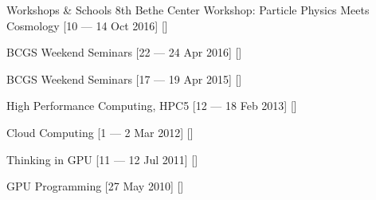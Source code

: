 \begin{cvsection}{Workshops \& Schools}
    \cvitem
    {8th Bethe Center Workshop: Particle Physics Meets Cosmology}
    [10 --- 14 Oct 2016]
    [\badhonnef]
    
    \cvitem
    {BCGS Weekend Seminars}
    [22 --- 24 Apr 2016]
    [\badhonnef]
    
    \cvitem
    {BCGS Weekend Seminars}
    [17 --- 19 Apr 2015]
    [\badhonnef]
    
    \cvitem
    {High Performance Computing, HPC5}
    [12 --- 18 Feb 2013]
    [\IPM]
    
    \cvitem
    {Cloud Computing}
    [1 --- 2 Mar 2012]
    [\IPM]
    
    \cvitem
    {Thinking in GPU}
    [11 --- 12 Jul 2011]
    [\IPM]
    
    \cvitem
    {GPU Programming}
    [27 May 2010]
    [\IPM]
\end{cvsection}
